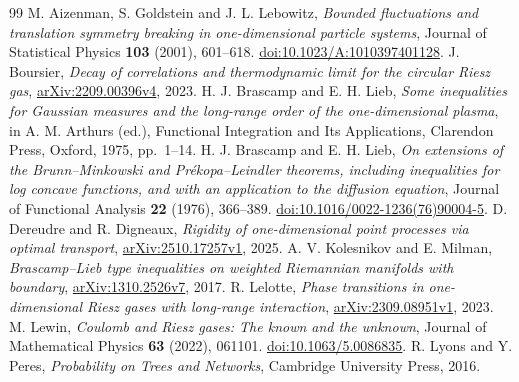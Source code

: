 \documentclass[11pt]{article}
\theoremstyle{remark}\newtheorem{remark}[theorem]{Remark}
\begin{document}
\begin{thebibliography}{99}
 M. Aizenman, S. Goldstein and J. L. Lebowitz,
\emph{Bounded fluctuations and translation symmetry breaking in
one-dimensional particle systems},
Journal of Statistical Physics \textbf{103} (2001), 601--618.
\href{https://doi.org/10.1023/A:1010397401128}{doi:10.1023/A:1010397401128}.
 J. Boursier,
\emph{Decay of correlations and thermodynamic limit for the circular
Riesz gas},
\href{https://arxiv.org/abs/2209.00396v4}{arXiv:2209.00396v4}, 2023.
 H. J. Brascamp and E. H. Lieb,
\emph{Some inequalities for Gaussian measures and the long-range order
of the one-dimensional plasma},
in A. M. Arthurs (ed.), Functional Integration and Its Applications,
Clarendon Press, Oxford, 1975, pp.~1--14.
 H. J. Brascamp and E. H. Lieb,
\emph{On extensions of the Brunn--Minkowski and Pr\'ekopa--Leindler
theorems, including inequalities for log concave functions, and with an
application to the diffusion equation},
Journal of Functional Analysis \textbf{22} (1976), 366--389.
\href{https://doi.org/10.1016/0022-1236(76)90004-5}{doi:10.1016/0022-1236(76)90004-5}.
 D. Dereudre and R. Digneaux,
\emph{Rigidity of one-dimensional point processes via optimal transport},
\href{https://arxiv.org/abs/2510.17257v1}{arXiv:2510.17257v1}, 2025.
 A. V. Kolesnikov and E. Milman,
\emph{Brascamp--Lieb type inequalities on weighted Riemannian
manifolds with boundary},
\href{https://arxiv.org/abs/1310.2526v7}{arXiv:1310.2526v7}, 2017.
 R. Lelotte,
\emph{Phase transitions in one-dimensional Riesz gases with long-range interaction},
\href{https://arxiv.org/abs/2309.08951v1}{arXiv:2309.08951v1}, 2023.
 M. Lewin,
\emph{Coulomb and Riesz gases: The known and the unknown},
Journal of Mathematical Physics \textbf{63} (2022), 061101.
\href{https://doi.org/10.1063/5.0086835}{doi:10.1063/5.0086835}.
 R. Lyons and Y. Peres,
\emph{Probability on Trees and Networks},
Cambridge University Press, 2016.
\end{thebibliography}
\end{document}
